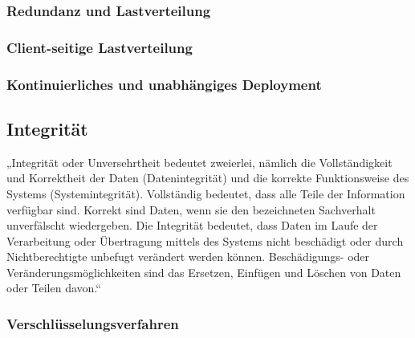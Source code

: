 \subsubsection{Redundanz und Lastverteilung}

\subsubsection{Client-seitige Lastverteilung}

\subsubsection{Kontinuierliches und unabhängiges Deployment}


\subsection{Integrität}
\label{subsec:integrität}
„Integrität oder Unversehrtheit bedeutet zweierlei, nämlich die Vollständigkeit und Korrektheit der Daten (Datenintegrität) und die korrekte Funktionsweise des Systems (Systemintegrität). Vollständig bedeutet, dass alle Teile der Information verfügbar sind. Korrekt sind Daten, wenn sie den bezeichneten Sachverhalt unverfälscht wiedergeben. Die Integrität bedeutet, dass Daten im Laufe der Verarbeitung oder Übertragung mittels des Systems nicht beschädigt oder durch Nichtberechtigte unbefugt verändert werden können. Beschädigungs- oder Veränderungsmöglichkeiten sind das Ersetzen, Einfügen und Löschen von Daten oder Teilen davon.“ \cite{Bedner+10}

\subsubsection{Verschlüsselungsverfahren}